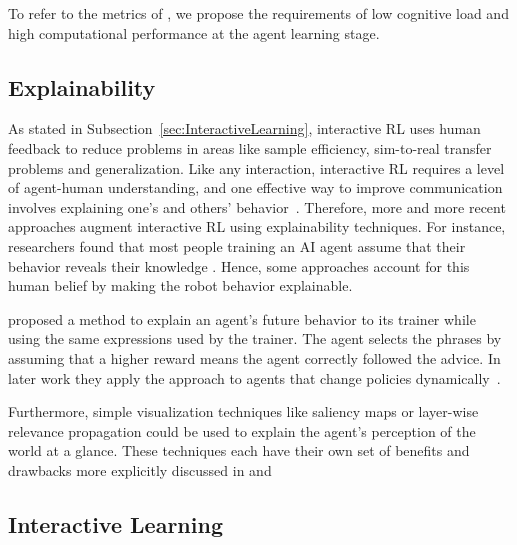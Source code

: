 \documentclass[twoside,11pt]{article}
\begin{document}
\begin{enumerate}
To refer to the metrics of \citet{milani2022survey}, we propose the requirements of low cognitive load and high computational performance at the agent learning stage.

\subsection{Explainability}
As stated in Subsection~\ref{sec:InteractiveLearning}, interactive RL uses human feedback to reduce problems in areas like sample efficiency, sim-to-real transfer problems and generalization. Like any interaction, interactive RL requires a level of agent-human understanding, and one effective way to improve communication involves explaining one's and others' behavior~\citep{de:17}. Therefore, more and more recent approaches augment interactive RL using explainability techniques. For instance, researchers found that most people training an AI agent assume that their behavior reveals their knowledge \citep{habibian:21}. Hence, some approaches account for this human belief by making the robot behavior explainable.

\citet{fukuchi2017autonomous} proposed a method to explain an agent's future behavior to its trainer while using the same expressions used by the trainer. The agent selects the phrases by assuming that a higher reward means the agent correctly followed the advice. In later work they apply the approach to agents that change policies dynamically~\citep{fukuchi2017application}. 

Furthermore, simple visualization techniques like saliency maps or layer-wise relevance propagation could be used to explain the agent's perception of the world at a glance. These techniques each have their own set of benefits and drawbacks more explicitly discussed in \citet{LiuEtAl:2018:LinearModelUTrees} and \citet{Bach:2015:LayerWiseRelevancePropagation}


\subsection{Interactive Learning}


\end{enumerate}
\end{document}

